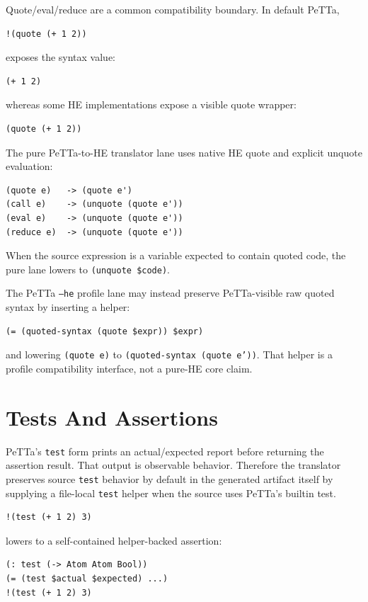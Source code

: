 \documentclass[11pt]{article}
\newcommand{\code}[1]{\texttt{#1}}
\newcommand{\HE}{\textup{HE}}
\newcommand{\PeTTa}{\textup{PeTTa}}
\begin{document}
Quote/eval/reduce are a common compatibility boundary.  In default \PeTTa{},
\begin{lstlisting}
!(quote (+ 1 2))
\end{lstlisting}
exposes the syntax value:
\begin{lstlisting}
(+ 1 2)
\end{lstlisting}
whereas some \HE{} implementations expose a visible quote wrapper:
\begin{lstlisting}
(quote (+ 1 2))
\end{lstlisting}

The pure \PeTTa{}-to-\HE{} translator lane uses native \HE{} quote and explicit
unquote evaluation:
\begin{lstlisting}
(quote e)   -> (quote e')
(call e)    -> (unquote (quote e'))
(eval e)    -> (unquote (quote e'))
(reduce e)  -> (unquote (quote e'))
\end{lstlisting}
When the source expression is a variable expected to contain quoted code, the
pure lane lowers to \code{(unquote \$code)}.

The \PeTTa{} \code{--he} profile lane may instead preserve \PeTTa{}-visible raw
quoted syntax by inserting a helper:
\begin{lstlisting}
(= (quoted-syntax (quote $expr)) $expr)
\end{lstlisting}
and lowering \code{(quote e)} to
\code{(quoted-syntax (quote e'))}.  That helper is a profile compatibility
interface, not a pure-\HE{} core claim.

\section{Tests And Assertions}

\PeTTa{}'s \code{test} form prints an actual/expected report before returning
the assertion result.  That output is observable behavior.  Therefore the
translator preserves source \code{test} behavior by default in the generated
artifact itself by supplying a file-local \code{test} helper when the source
uses \PeTTa{}'s builtin test.

\begin{lstlisting}
!(test (+ 1 2) 3)
\end{lstlisting}

lowers to a self-contained helper-backed assertion:

\begin{lstlisting}
(: test (-> Atom Atom Bool))
(= (test $actual $expected) ...)
!(test (+ 1 2) 3)
\end{lstlisting}
\end{document}

